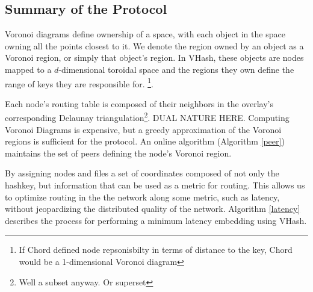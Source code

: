 \documentclass{IEEEtran}
\begin{document}
 







\subsection{Summary of the Protocol}
Voronoi diagrams define ownership of a space, with each object in the space owning all the points closest to it.  We denote the region owned by an object as a Voronoi region, or simply that object's region.  In VHash, these objects are nodes mapped to a $d$-dimensional toroidal space and the regions they own define the range of keys they are responsible for.  \footnote{If Chord defined node repsonisbilty in terms of distance to the key, Chord would be a 1-dimensional Voronoi diagram}.  


Each node's routing table is composed of their neighbors in the overlay's corresponding Delaunay triangulation\footnote{Well a subset anyway. Or superset}.  DUAL NATURE HERE.  Computing Voronoi Diagrams is expensive, but a greedy approximation of the Voronoi regions is sufficient for the protocol.  An online algorithm (Algorithm \ref{peer}) maintains the set of peers defining the node's Voronoi region.


By assigning nodes and files a set of coordinates composed of not only the hashkey, but information that can be used as a metric for routing.  This allows us to optimize routing in the the network along some metric, such as latency, without jeopardizing the distributed quality of the network.  Algorithm \ref{latency} describes the process for performing a minimum latency embedding using VHash.
\end{document}
